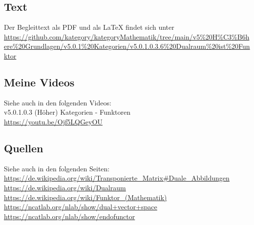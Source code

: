 \documentclass[a4paper]{amsart}
\theoremstyle{definition}
\begin{document}
\subsection*{Text}
Der Begleittext als PDF und als LaTeX findet sich unter
{\tiny
   \url{https://github.com/kategory/kategoryMathematik/tree/main/v5%20H%C3%B6here%20Grundlagen/v5.0.1%20Kategorien/v5.0.1.0.3.6%20Dualraum%20ist%20Funktor}
}

\subsection*{Meine Videos}
Siehe auch in den folgenden Videos:\\
v5.0.1.0.3 (Höher) Kategorien - Funktoren\\
\url{https://youtu.be/Ojf5LQGeyOU}\\

\subsection*{Quellen}
Siehe auch in den folgenden Seiten:\\
\url{https://de.wikipedia.org/wiki/Transponierte_Matrix#Duale_Abbildungen}\\
\url{https://de.wikipedia.org/wiki/Dualraum}\\
\url{https://de.wikipedia.org/wiki/Funktor_(Mathematik)}\\
\url{https://ncatlab.org/nlab/show/dual+vector+space}\\
\url{https://ncatlab.org/nlab/show/endofunctor}\\

\end{document}

